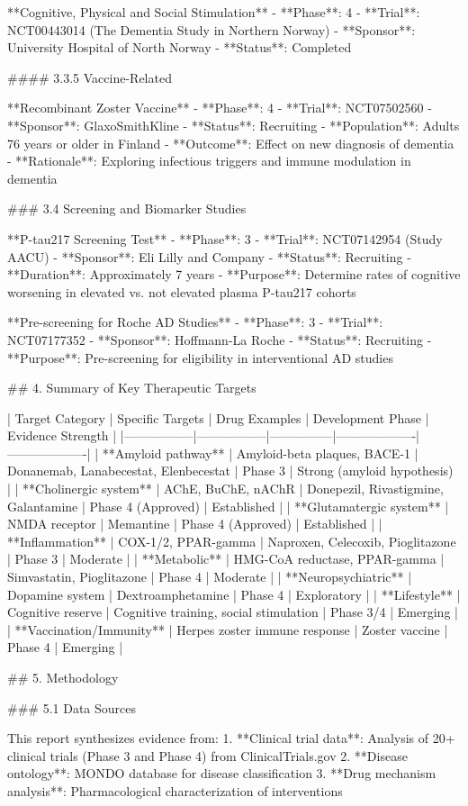 **Cognitive, Physical and Social Stimulation**
- **Phase**: 4
- **Trial**: NCT00443014 (The Dementia Study in Northern Norway)
- **Sponsor**: University Hospital of North Norway
- **Status**: Completed

#### 3.3.5 Vaccine-Related

**Recombinant Zoster Vaccine**
- **Phase**: 4
- **Trial**: NCT07502560
- **Sponsor**: GlaxoSmithKline
- **Status**: Recruiting
- **Population**: Adults 76 years or older in Finland
- **Outcome**: Effect on new diagnosis of dementia
- **Rationale**: Exploring infectious triggers and immune modulation in dementia

### 3.4 Screening and Biomarker Studies

**P-tau217 Screening Test**
- **Phase**: 3
- **Trial**: NCT07142954 (Study AACU)
- **Sponsor**: Eli Lilly and Company
- **Status**: Recruiting
- **Duration**: Approximately 7 years
- **Purpose**: Determine rates of cognitive worsening in elevated vs. not elevated plasma P-tau217 cohorts

**Pre-screening for Roche AD Studies**
- **Phase**: 3
- **Trial**: NCT07177352
- **Sponsor**: Hoffmann-La Roche
- **Status**: Recruiting
- **Purpose**: Pre-screening for eligibility in interventional AD studies

## 4. Summary of Key Therapeutic Targets

| Target Category | Specific Targets | Drug Examples | Development Phase | Evidence Strength |
|-----------------|-----------------|---------------|-------------------|-------------------|
| **Amyloid pathway** | Amyloid-beta plaques, BACE-1 | Donanemab, Lanabecestat, Elenbecestat | Phase 3 | Strong (amyloid hypothesis) |
| **Cholinergic system** | AChE, BuChE, nAChR | Donepezil, Rivastigmine, Galantamine | Phase 4 (Approved) | Established |
| **Glutamatergic system** | NMDA receptor | Memantine | Phase 4 (Approved) | Established |
| **Inflammation** | COX-1/2, PPAR-gamma | Naproxen, Celecoxib, Pioglitazone | Phase 3 | Moderate |
| **Metabolic** | HMG-CoA reductase, PPAR-gamma | Simvastatin, Pioglitazone | Phase 4 | Moderate |
| **Neuropsychiatric** | Dopamine system | Dextroamphetamine | Phase 4 | Exploratory |
| **Lifestyle** | Cognitive reserve | Cognitive training, social stimulation | Phase 3/4 | Emerging |
| **Vaccination/Immunity** | Herpes zoster immune response | Zoster vaccine | Phase 4 | Emerging |

## 5. Methodology

### 5.1 Data Sources

This report synthesizes evidence from:
1. **Clinical trial data**: Analysis of 20+ clinical trials (Phase 3 and Phase 4) from ClinicalTrials.gov
2. **Disease ontology**: MONDO database for disease classification
3. **Drug mechanism analysis**: Pharmacological characterization of interventions


